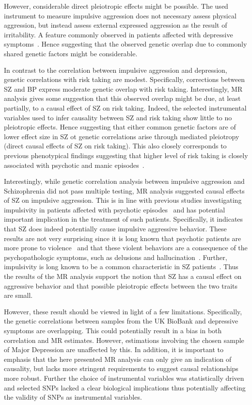 However, considerable direct pleiotropic effects might be possible.
The used instrument to measure impulsive aggression does not necessary assess physical aggression, but instead assess external expressed aggression as the result of irritability. 
A feature commonly observed in patients affected with depressive symptoms~\cite{Dutton2013,Clark1994}.
Hence suggesting that the observed genetic overlap due to commonly shared genetic factors might be considerable.

In contrast to the correlation between impulsive aggression and depression, genetic correlations with risk taking are modest.
Specifically, corrections between SZ and BP express moderate genetic overlap with risk taking.
Interestingly, MR analysis gives some suggestion that this observed overlap might be due, at least partially, to a causal effect of SZ on risk taking.
Indeed, the selected instrumental variables used to infer causality between SZ and risk taking show little to no pleiotropic effects.
Hence suggesting that either common genetic factors are of lower effect size in SZ ot genetic correlations arise through mediated pleiotropy (direct causal effects of SZ on risk taking). 
This also closely corresponds to previous phenotypical findings suggesting that higher level of risk taking is closely associated with psychotic and manic episodes~\cite{Johnson2012,APA1994,AmericanPsychiatricAssociation2013}.

Interestingly, while genetic correlation analysis between impulsive aggression and Schizophrenia did not pass multiple testing, MR analysis suggested causal effects of SZ on impulsive aggression. 
This is in line with previous studies investigating impulsivity in patients affected with psychotic episodes~\cite{Ouzir2013} and has potential important implication in the treatment of such patients.
Specifically, it indicates that SZ does indeed potentially cause impulsive aggressive behavior.
These results are not very surprising since it is long known that psychotic patients are more prone to violence~\cite{Douglas2009} and that these violent behaviors are a consequence of the psychopathologic symptoms, such as delusions and hallucination~\cite{Swanson2006}.
Further, impulsivity is long known to be a common characteristic in SZ patients~\citet{Ouzir2013}.
Thus the results of the MR analysis support the notion that SZ has a causal effect on aggressive behavior and that possible pleiotropic effects between the two traits are small.

However, these result should be viewed in light of a few limitations.
Specifically, the genetic correlations between samples from the UK BioBank and depressive symptoms are overlapping.
This could potentially result in a bias in both correlation and MR estimates.
However, estimations involving the chosen sample of Major Depression are unaffected by this.
In addition, it is important to emphasis that the here presented MR analysis can only give an indication of causality, but lacks more stringent requirements to suggest causal relationships more robust.
Further the choice of instrumental variables was statistically driven and selected SNPs lacked a clear biological implications thus potentially affecting the validity of SNPs as instrumental variables.

